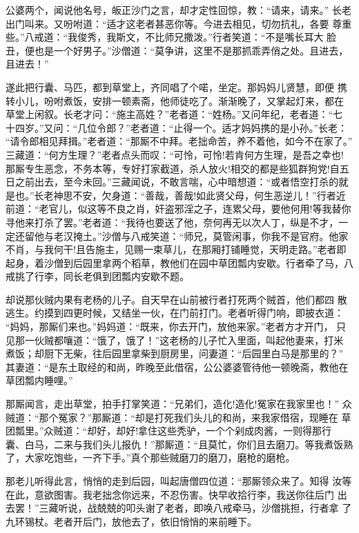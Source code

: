 公婆两个，闻说他名号，皈正沙门之言，却才定性回惊，教：“请来，请来。”
长老出门叫来。又吩咐道：“适才这老者甚恶你等。今进去相见，切勿抗礼，各要
尊重些。”八戒道：“我俊秀，我斯文，不比师兄撒泼。”行者笑道：“不是嘴长耳大
脸丑，便也是一个好男子。”沙僧道：“莫争讲，这里不是那抓乖弄俏之处。且进去，
且进去！”

遂此把行囊、马匹，都到草堂上，齐同唱了个喏，坐定。那妈妈儿贤慧，即便
携转小儿，吩咐煮饭，安排一顿素斋，他师徒吃了。渐渐晚了，又掌起灯来，都在
草堂上闲叙。长老才问：“施主高姓？”老者道：“姓杨。”又问年纪，老者道：“七
十四岁。”又问：“几位令郎？”老者道：“止得一个。适才妈妈携的是小孙。”长老：
“请令郎相见拜揖。”老者道：“那厮不中拜。老拙命苦，养不着他，如今不在家了。”
三藏道：“何方生理？”老者点头而叹：“可怜，可怜!若肯何方生理，是吾之幸也!
那厮专生恶念，不务本等，专好打家截道，杀人放火!相交的都是些狐群狗党!自五
日之前出去，至今未回。”三藏闻说，不敢言喘，心中暗想道：“或者悟空打杀的就
是也。”长老神思不安，欠身道：“善哉，善哉!如此贤父母，何生恶逆儿！”行者近
前道：“老官儿，似这等不良之肖，奸盗邪淫之子，连累父母，要他何用!等我替你
寻他来打杀了罢。”老者道：“我待也要送了他，奈何再无以次人丁，纵是不才，一
定还留他与老汉掩土。”沙僧与八戒笑道：“师兄，莫管闲事，你我不是官府。他家
不肖，与我何干!且告施主，见赐一束草儿，在那厢打铺睡觉，天明走路。”老者即
起身，着沙僧到后园里拿两个稻草，教他们在园中草团瓢内安歇。行者牵了马，八
戒挑了行李，同长老俱到团瓢内安歇不题。

却说那伙贼内果有老杨的儿子。自天早在山前被行者打死两个贼首，他们都四
散逃生。约摸到四更时候，又结坐一伙，在门前打门。老者听得门响，即披衣道：
“妈妈，那厮们来也。”妈妈道：“既来，你去开门，放他来家。”老者方才开门，
只见那一伙贼都嚷道：“饿了，饿了！”这老杨的儿子忙入里面，叫起他妻来，打米
煮饭；却厨下无柴，往后园里拿柴到厨房里，问妻道：“后园里白马是那里的？”
其妻道：“是东土取经的和尚，昨晚至此借宿，公公婆婆管待他一顿晚斋，教他在
草团瓢内睡哩。”

那厮闻言，走出草堂，拍手打掌笑道：“兄弟们，造化!造化!冤家在我家里也！”
众贼道：“那个冤家？”那厮道：“却是打死我们头儿的和尚，来我家借宿，现睡在
草团瓢里。”众贼道：“却好，却好!拿住这些秃驴，一个个剁成肉酱，一则得那行
囊、白马，二来与我们头儿报仇！”那厮道：“且莫忙，你们且去磨刀。等我煮饭熟
了，大家吃饱些，一齐下手。”真个那些贼磨刀的磨刀，磨枪的磨枪。

那老儿听得此言，悄悄的走到后园，叫起唐僧四位道：“那厮领众来了。知得
汝等在此，意欲图害。我老拙念你远来，不忍伤害。快早收拾行李，我送你往后门
出去罢！”三藏听说，战兢兢的叩头谢了老者，即唤八戒牵马，沙僧挑担，行者拿
了九环锡杖。老者开后门，放他去了，依旧悄悄的来前睡下。

